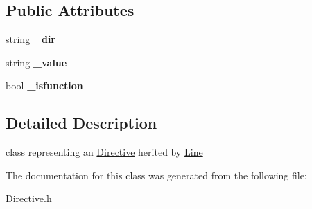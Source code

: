 \subsection*{\-Public \-Attributes}
\begin{DoxyCompactItemize}
\item 
\hypertarget{classDirective_a3e89203d14d83c6ff8da7a1c49b9a60e}{string {\bfseries \-\_\-dir}}\label{classDirective_a3e89203d14d83c6ff8da7a1c49b9a60e}

\item 
\hypertarget{classDirective_aaeaa71135c6d434d58db763a1e2b70e3}{string {\bfseries \-\_\-value}}\label{classDirective_aaeaa71135c6d434d58db763a1e2b70e3}

\item 
\hypertarget{classDirective_ae9e02b1ecc6a1b5387f5227959984c1f}{bool {\bfseries \-\_\-isfunction}}\label{classDirective_ae9e02b1ecc6a1b5387f5227959984c1f}

\end{DoxyCompactItemize}


\subsection{\-Detailed \-Description}
class representing an \hyperlink{classDirective}{\-Directive} herited by \hyperlink{classLine}{\-Line} 

\-The documentation for this class was generated from the following file\-:\begin{DoxyCompactItemize}
\item 
\hyperlink{Directive_8h}{\-Directive.\-h}\end{DoxyCompactItemize}
